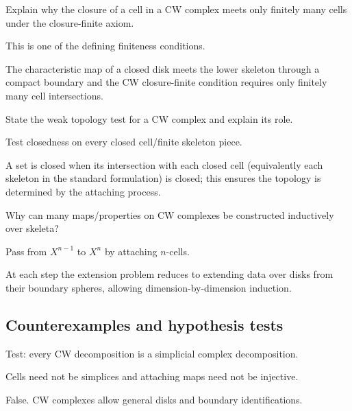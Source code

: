 \begin{exercise}\label{exr:viii06-ped-07}
Explain why the closure of a cell in a CW complex meets only finitely many cells under the closure-finite axiom.
\end{exercise}
\begin{hint}
This is one of the defining finiteness conditions.
\end{hint}
\begin{solution}
The characteristic map of a closed disk meets the lower skeleton through a compact boundary and the CW closure-finite condition requires only finitely many cell intersections.
\end{solution}

\begin{exercise}\label{exr:viii06-ped-08}
State the weak topology test for a CW complex and explain its role.
\end{exercise}
\begin{hint}
Test closedness on every closed cell/finite skeleton piece.
\end{hint}
\begin{solution}
A set is closed when its intersection with each closed cell (equivalently each skeleton in the standard formulation) is closed; this ensures the topology is determined by the attaching process.
\end{solution}

\begin{exercise}\label{exr:viii06-ped-09}
Why can many maps/properties on CW complexes be constructed inductively over skeleta?
\end{exercise}
\begin{hint}
Pass from $X^{n-1}$ to $X^n$ by attaching $n$-cells.
\end{hint}
\begin{solution}
At each step the extension problem reduces to extending data over disks from their boundary spheres, allowing dimension-by-dimension induction.
\end{solution}

\subsection*{Counterexamples and hypothesis tests}

\begin{exercise}\label{exr:viii06-ped-10}
Test: every CW decomposition is a simplicial complex decomposition.
\end{exercise}
\begin{hint}
Cells need not be simplices and attaching maps need not be injective.
\end{hint}
\begin{solution}
False. CW complexes allow general disks and boundary identifications.
\end{solution}

